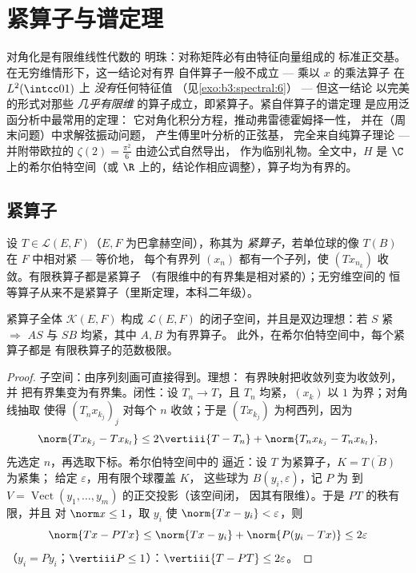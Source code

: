 \chapter{紧算子与谱定理}
\label{ch:b3:spectral}

对角化是有限维线性代数的
明珠：对称矩阵必有由特征向量组成的
标准正交基。在无穷维情形下，这一结论对有界
自伴算子一般不成立 --- 乘以 $x$ 的乘法算子
在 $L^2(\intcc01)$ 上 \emph{没有}任何特征值
（见\cref{exo:b3:spectral:6}） --- 但这一结论
以完美的形式对那些 \emph{几乎有限维
}的算子成立，即紧算子。紧自伴算子的谱定理
是应用泛函分析中最常用的定理：
它对角化积分方程，推动弗雷德霍姆择一性，
并在（周末问题）中求解弦振动问题，
产生傅里叶分析的正弦基，
完全来自纯算子理论 --- 并附带欧拉的
$\zeta(2) = \frac{\pi^2}6$ 由迹公式自然导出，
作为临别礼物。全文中，$H$ 是 $\C$ 上的希尔伯特空间（或
$\R$ 上的，结论作相应调整），算子均为有界的。

\section{紧算子}

\begin{definition}\label{def:b3:spectral:compact}
设 $T \in \mathcal L(E, F)$（$E, F$ 为巴拿赫空间），称其为
\emph{紧算子}，若单位球的像 $T(B)$
在 $F$ 中相对紧 --- 等价地，
每个有界列 $(x_n)$ 都有一个子列，使
$(Tx_{n_k})$ 收敛。有限秩算子都是紧算子
（有限维中的有界集是相对紧的）；无穷维空间的
恒等算子从来不是紧算子（里斯定理，本科二年级）。
\end{definition}

\begin{proposition}\label{prop:b3:spectral:ideal}
紧算子全体 $\mathcal K(E, F)$ 构成
$\mathcal L(E, F)$ 的闭子空间，并且是双边理想：若 $S$ 紧
$\Rightarrow$ $AS$ 与 $SB$ 均紧，其中 $A, B$ 为有界算子。
此外，在希尔伯特空间中，每个紧算子都是
有限秩算子的范数极限。
\end{proposition}

\begin{proof}
子空间：由序列刻画可直接得到。理想：
有界映射把收敛列变为收敛列，并
把有界集变为有界集。闭性：设 $T_n \to T$，且 $T_n$
均紧，$(x_k)$ 以 $1$ 为界；对角线抽取
使得 $(T_nx_{k_j})_j$ 对每个 $n$ 收敛；于是
$(Tx_{k_j})$ 为柯西列，因为
\[
\norm{Tx_{k_j} - Tx_{k_l}} \leq 2\vertiii{T - T_n} +
\norm{T_nx_{k_j} - T_nx_{k_l}} ,
\]
先选定 $n$，再选取下标。希尔伯特空间中的
逼近：设 $T$ 为紧算子，$K = \overline{T(B)}$ 为紧集；
给定 $\varepsilon$，用有限个球覆盖 $K$，
这些球为 $B(y_i, \varepsilon)$，记 $P$ 为
到 $V = \operatorname{Vect}(y_1, \dots, y_m)$ 的正交投影（该空间闭，
因其有限维）。于是 $PT$ 的秩有限，并且
对 $\norm x \leq 1$，取 $y_i$ 使 $\norm{Tx - y_i} <
\varepsilon$，则
\[
\norm{Tx - PTx} \leq \norm{Tx - y_i} + \norm{P(y_i - Tx)}
\leq 2\varepsilon
\]
（$y_i = Py_i$；$\vertiii P \leq 1$）：$\vertiii{T - PT} \leq
2\varepsilon$。
\end{proof}

